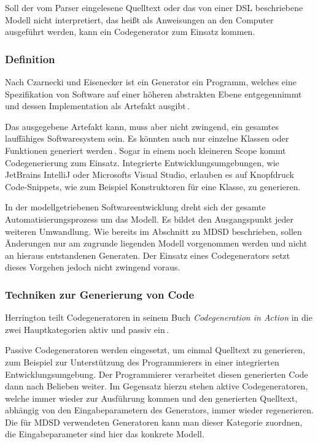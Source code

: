 \documentclass[12pt,oneside,a4paper,parskip]{scrbook}
\begin{document}
Soll der vom Parser eingelesene Quelltext oder das von einer DSL beschriebene Modell nicht interpretiert, das heißt als Anweisungen an den Computer ausgeführt werden, kann ein Codegenerator zum Einsatz kommen.

\subsubsection{Definition}

Nach Czarnecki und Eisenecker ist ein Generator ein Programm, welches eine Spezifikation von Software auf einer höheren abstrakten Ebene entgegennimmt und dessen Implementation als Artefakt ausgibt\,\cite[S.\,333]{czaeis2000}.

Das ausgegebene Artefakt kann, muss aber nicht zwingend, ein gesamtes lauffähiges Softwaresystem sein. Es könnten auch nur einzelne Klassen oder Funktionen generiert werden\,\cite[S.\,333]{czaeis2000}. Sogar in einem noch kleineren Scope kommt Codegenerierung zum Einsatz. Integrierte Entwicklungsumgebungen, wie JetBrains IntelliJ oder Microsofts Visual Studio, erlauben es auf Knopfdruck Code-Snippets, wie zum Beispiel Konstruktoren für eine Klasse, zu generieren.

In der modellgetriebenen Softwareentwicklung dreht sich der gesamte Automatisierungsprozess um das Modell. Es bildet den Ausgangspunkt jeder weiteren Umwandlung. Wie bereits im Abschnitt zu MDSD beschrieben, sollen Änderungen nur am zugrunde liegenden Modell vorgenommen werden und nicht an hieraus entstandenen Generaten. Der Einsatz eines Codegenerators setzt dieses Vorgehen jedoch nicht zwingend voraus.

\subsubsection{Techniken zur Generierung von Code}

Herrington teilt Codegeneratoren in seinem Buch \textit{Codegeneration in Action} in die zwei Hauptkategorien aktiv und passiv ein\,\cite[S.\,28]{herrington2003}.

Passive Codegeneratoren werden eingesetzt, um einmal Quelltext zu generieren, zum Beispiel zur Unterstützung des Programmierers in einer integrierten Entwicklungsumgebung. Der Programmierer verarbeitet diesen generierten Code dann nach Belieben weiter. Im Gegensatz hierzu stehen aktive Codegeneratoren, welche immer wieder zur Ausführung kommen und den generierten Quelltext, abhängig von den Eingabeparametern des Generators, immer wieder regenerieren. Die für MDSD verwendeten Generatoren kann man dieser Kategorie zuordnen, die Eingabeparameter sind hier das konkrete Modell.
\end{document}
